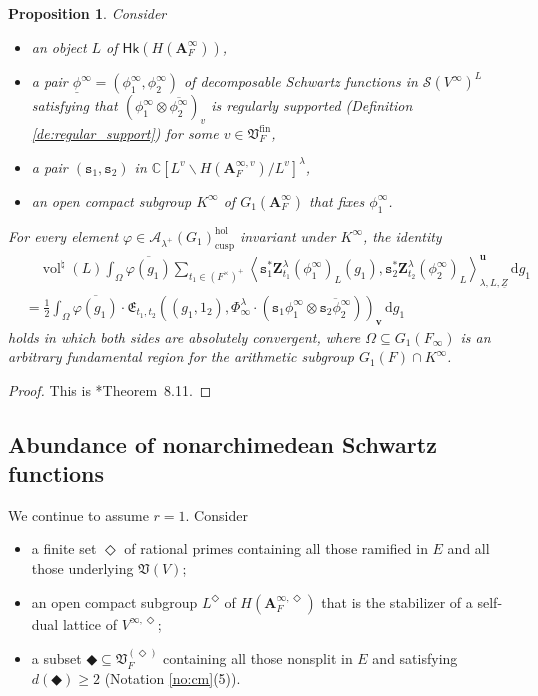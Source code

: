\documentclass[12pt]{amsart}
\numberwithin{equation}{section}
\theoremstyle{plain}
\newtheorem{proposition}{Proposition}[section]
\theoremstyle{definition}
\theoremstyle{remark}
\renewcommand{\b}[1]{\mathbf{#1}}
\renewcommand{\c}[1]{\mathcal{#1}}
\renewcommand{\d}[1]{\mathbb{#1}}
\newcommand{\f}[1]{\mathfrak{#1}}
\renewcommand{\r}[1]{\mathrm{#1}}
\newcommand{\s}[1]{\mathscr{#1}}
\renewcommand{\sf}[1]{\mathsf{#1}}
\renewcommand{\(}{\left(}
\renewcommand{\)}{\right)}
\newcommand{\ol}[1]{\overline{#1}{}}
\newcommand{\ul}{\underline}
\renewcommand{\geq}{\geqslant}
\newcommand{\bA}{\b A}
\newcommand{\cA}{\c A}
\newcommand{\dC}{\d C}
\newcommand{\fE}{\f E}
\newcommand{\fV}{\f V}
\newcommand{\rd}{\,\r d}
\newcommand{\sS}{\s S}
\newcommand{\ts}{\mathtt{s}}
\newcommand{\bbu}{\boldsymbol{u}}
\newcommand{\bbv}{\boldsymbol{v}}
\newcommand{\bbZ}{\boldsymbol{Z}}
\newcommand{\llangle}{\left\langle}
\newcommand{\rrangle}{\right\rangle}
\newcommand{\cusp}{\r{cusp}}
\newcommand{\fin}{\r{fin}}
\newcommand{\hol}{\r{hol}}
\newcommand{\Hk}{\sf{Hk}}
\DeclareMathOperator{\vol}{vol}
\begin{document}
\begin{proposition}\label{pr:height_archimedean_bis}
Consider
\begin{itemize}
  \item an object $L$ of $\Hk(H(\bA_F^\infty))$,

  \item a pair $\ul\phi^\infty=(\phi^\infty_1,\phi^\infty_2)$ of decomposable Schwartz functions in $\sS(V^\infty)^L$ satisfying that $(\phi^\infty_1\otimes\ol{\phi^\infty_2})_v$ is regularly supported (Definition \ref{de:regular_support}) for some $v\in\fV_F^\fin$,

  \item a pair $(\ts_1,\ts_2)$ in $\dC[L^v\backslash H(\bA_F^{\infty,v})/L^v]^\lambda$,

  \item an open compact subgroup $K^\infty$ of $G_1(\bA_F^\infty)$ that fixes $\phi^\infty_1$.
\end{itemize}
For every element $\varphi\in\cA_{\lambda^+}(G_1)_\cusp^\hol$ invariant under $K^\infty$, the identity
\begin{align*}
&\quad\vol^\natural(L)
\int_{\Omega}\ol{\varphi(g_1)}
\sum_{t_1\in (F^\times)^+}\llangle\ts_1^*\bbZ^\lambda_{t_1}(\phi^\infty_1)_L(g_1),
\ts_2^*\bbZ^\lambda_{t_2}(\phi^\infty_2)_L\rrangle_{\lambda,L,\ul{Z}}^{\bbu} \rd g_1\\
&=\frac{1}{2}\int_{\Omega}\ol{\varphi(g_1)}\cdot
\fE_{t_1,t_2}((g_1,1_2),\Phi^\lambda_\infty\cdot(\ts_1\phi^\infty_1\otimes\ol{\ts_2\phi^\infty_2}))_{\bbv}  \rd g_1
\end{align*}
holds in which both sides are absolutely convergent, where $\Omega\subseteq G_1(F_\infty)$ is an arbitrary fundamental region for the arithmetic subgroup $G_1(F)\cap K^\infty$.
\end{proposition}

\begin{proof}
This is \cite{Liu26}*{Theorem~8.11}.
\end{proof}


\subsection{Abundance of nonarchimedean Schwartz functions}
\label{ss:abundance}

We continue to assume $r=1$. Consider
\begin{itemize}
  \item a finite set $\Diamond$ of rational primes containing all those ramified in $E$ and all those underlying $\fV(V)$;

  \item an open compact subgroup $L^\Diamond$ of $H(\bA^{\infty,\Diamond}_F)$ that is the stabilizer of a self-dual lattice of $V^{\infty,\Diamond}$;

  \item a subset $\Diamondblack\subseteq\fV_F^{(\Diamond)}$ containing all those nonsplit in $E$ and satisfying $d(\Diamondblack)\geq 2$ (Notation \ref{no:cm}(5)).
\end{itemize}
\end{document}
